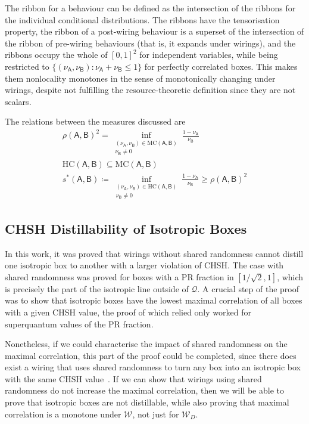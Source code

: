 \documentclass[10pt, a4paper]{article}
\numberwithin{equation}{section} %
\theoremstyle{definition}
\theoremstyle{plain}
\newcommand{\st}{\mathrel{:}} %
\newcommand{\?}{\mathrel{?}} %
\newcommand{\sW}{\mathcal{W}}
\newcommand{\crv}[1]{\mathsf{#1}}
\newcommand{\HC}{\mathrm{HC}}
\newcommand{\MC}{\mathrm{MC}}
\newcommand{\Qs}{\mathcal{Q}}
\begin{document}
    The ribbon for a behaviour can be defined as the intersection of the ribbons for the individual conditional distributions. The ribbons have the tensorisation property, the ribbon of a post-wiring behaviour is a superset of the intersection of the ribbon of pre-wiring behaviours (that is, it expands under wirings), and the ribbons occupy the whole of \({[0,1]}^2\) for independent variables, while being restricted to \(\{(\nu_{\crv{A}}, \nu_{\crv{B}}) \st \nu_{\crv{A}} + \nu_{\crv{B}} \leq 1\}\) for perfectly correlated boxes. This makes them nonlocality monotones in the sense of monotonically changing under wirings, despite not fulfilling the resource-theoretic definition since they are not scalars.

    The relations between the measures discussed are
    \begin{gather}
      {\rho(\crv{A},\crv{B})}^2 = \inf_{\substack{(\nu_{\crv{A}}, \nu_{\crv{B}}) \in \MC(\crv{A},\crv{B}) \\ \nu_{\crv{B}} \neq 0}} \frac{1 - \nu_{\crv{A}}}{\nu_{\crv{B}}} \\
      \HC(\crv{A},\crv{B}) \subseteq \MC(\crv{A},\crv{B}) \\
      s^*(\crv{A},\crv{B}) \coloneqq \inf_{\substack{(\nu_{\crv{A}}, \nu_{\crv{B}}) \in \HC(\crv{A},\crv{B}) \\ \nu_{\crv{B}} \neq 0}} \frac{1 - \nu_{\crv{A}}}{\nu_{\crv{B}}} \geq {\rho(\crv{A},\crv{B})}^2
    \end{gather}

    \subsection{CHSH Distillability of Isotropic Boxes}\label{sec:nlmono_isodist}

    In this work, it was proved that wirings without shared randomness cannot distill one isotropic box to another with a larger violation of CHSH. The case with shared randomness was proved for boxes with a PR fraction in \([1/\sqrt{2}, 1]\), which is precisely the part of the isotropic line outside of \(\Qs\). A crucial step of the proof was to show that isotropic boxes have the lowest maximal correlation of all boxes with a given CHSH value, the proof of which relied only worked for superquantum values of the PR fraction.

    Nonetheless, if we could characterise the impact of shared randomness on the maximal correlation, this part of the proof could be completed, since there does exist a wiring that uses shared randomness to turn any box into an isotropic box with the same CHSH value~\cite{NSTheories}. If we can show that wirings using shared randomness do not increase the maximal correlation, then we will be able to prove that isotropic boxes are not distillable, while also proving that maximal correlation is a monotone under \(\sW\), not just for \(\sW_D\).
\end{document}
